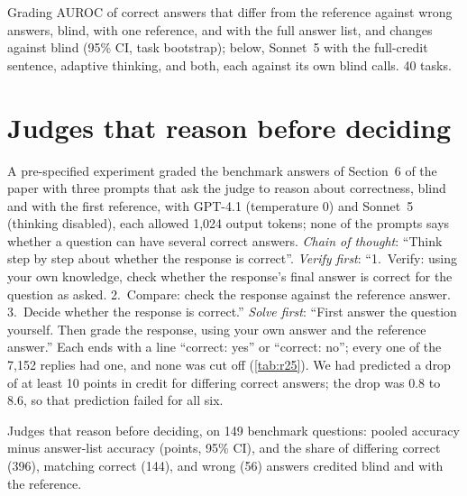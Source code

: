 \begin{table}[htbp]
\centering
\caption{Grading AUROC of correct answers that differ from the reference against wrong answers, blind, with one reference, and with the full answer list, and changes against blind (95\% CI, task bootstrap); below, Sonnet~5 with the full-credit sentence, adaptive thinking, and both, each against its own blind calls. 40 tasks.\pre}
\label{tab:r24-fix}
\footnotesize
\setlength{\tabcolsep}{3pt}
\begin{adjustbox}{max width=\linewidth}\end{adjustbox}
\end{table}

\FloatBarrier
\section{Judges that reason before deciding}
\label{app:r25}

A pre-specified experiment graded the benchmark answers of Section~6 of the paper with three prompts that ask the judge to reason about correctness, blind and with the first reference, with GPT-4.1 (temperature 0) and Sonnet~5 (thinking disabled), each allowed 1,024 output tokens; none of the prompts says whether a question can have several correct answers. \emph{Chain of thought}: ``Think step by step about whether the response is correct''. \emph{Verify first}: ``1.~Verify: using your own knowledge, check whether the response's final answer is correct for the question as asked. 2.~Compare: check the response against the reference answer. 3.~Decide whether the response is correct.'' \emph{Solve first}: ``First answer the question yourself. Then grade the response, using your own answer and the reference answer.'' Each ends with a line ``correct: yes'' or ``correct: no''; every one of the 7,152 replies had one, and none was cut off (\cref{tab:r25}). We had predicted a drop of at least 10 points in credit for differing correct answers; the drop was 0.8 to 8.6, so that prediction failed for all six.

\begin{table}[htbp]
\centering
\caption{Judges that reason before deciding, on 149 benchmark questions: pooled accuracy minus answer-list accuracy (points, 95\% CI), and the share of differing correct (396), matching correct (144), and wrong (56) answers credited blind and with the reference.\pre}
\label{tab:r25}
\footnotesize
\setlength{\tabcolsep}{3pt}
\begin{adjustbox}{max width=\linewidth}\end{adjustbox}
\end{table}

